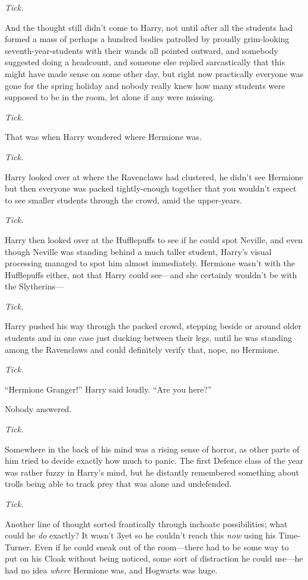 \emph{Tick.}

And the thought still didn’t come to Harry, not until after all the students had formed a mass of perhaps a hundred bodies patrolled by proudly grim-looking seventh-year-students with their wands all pointed outward, and somebody suggested doing a headcount, and someone else replied sarcastically that this might have made sense on some other day, but right now practically everyone was gone for the spring holiday and nobody really knew how many students were supposed to be in the room, let alone if any were missing.

\emph{Tick.}

That was when Harry wondered where Hermione was.

\emph{Tick.}

Harry looked over at where the Ravenclaws had clustered, he didn’t see Hermione but then everyone was packed tightly-enough together that you wouldn’t expect to see smaller students through the crowd, amid the upper-years.

\emph{Tick.}

Harry then looked over at the Hufflepuffs to see if he could spot Neville, and even though Neville was standing behind a much taller student, Harry’s visual processing managed to spot him almost immediately. Hermione wasn’t with the Hufflepuffs either, not that Harry could see—and she certainly wouldn’t be with the Slytherins—

\emph{Tick.}

Harry pushed his way through the packed crowd, stepping beside or around older students and in one case just ducking between their legs, until he was standing among the Ravenclaws and could definitely verify that, nope, no Hermione.

\emph{Tick.}

“Hermione Granger!” Harry said loudly. “Are you here?”

Nobody answered.

\emph{Tick.}

Somewhere in the back of his mind was a rising sense of horror, as other parts of him tried to decide exactly how much to panic. The first Defence class of the year was rather fuzzy in Harry’s mind, but he distantly remembered something about trolls being able to track prey that was alone and undefended.

\emph{Tick.}

Another line of thought sorted frantically through inchoate possibilities; what could he \emph{do} exactly? It wasn’t 3\pm yet so he couldn’t reach this \emph{now} using his Time-Turner. Even if he could sneak out of the room—there had to be some way to put on his Cloak without being noticed, some sort of distraction he could use—he had no idea \emph{where} Hermione was, and Hogwarts was huge.

